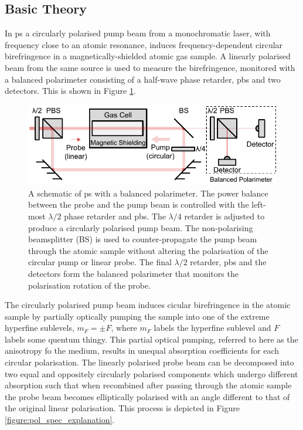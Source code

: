 \subsection{Basic Theory}

In \gls{ps} a circularly polarised pump beam from a monochromatic laser, with frequency close to an atomic resonance, induces frequency-dependent circular birefringence in a magnetically-shielded atomic gas sample.
A linearly polarised beam from the same source is used to measure the birefringence, monitored with a balanced polarimeter consisting of a half-wave phase retarder, \gls{pbs} and two detectors. This is shown in Figure \ref{figure:pol_spec_schematic}.

\begin{figure}
\centering
\includegraphics[width=\linewidth]{chapter1/Figs/PolSpecSchematic.pdf}
\caption{A schematic of \gls{ps} with a balanced polarimeter. The power balance between the probe and the pump beam is controlled with the left-most $\lambda/2$ phase retarder and \gls{pbs}. The $\lambda/4$ retarder is adjusted to produce a circularly polarised pump beam. The non-polarising beamsplitter (BS) is used to counter-propagate the pump beam through the atomic sample without altering the polarisation of the circular pump or linear probe. The final $\lambda/2$ retarder, \gls{pbs} and the detectors form the balanced polarimeter that monitors the polarisation rotation of the probe.}
\label{figure:pol_spec_schematic}
\end{figure}

The circularly polarised pump beam induces cicular birefringence in the atomic sample by partially optically pumping the sample into one of the extreme hyperfine sublevels, $m_F=\pm F$, where $m_F$ labels the hyperfine sublevel and $F$ labels {\color{red}some quentum thingy.}
This partial optical pumping, referred to here as the anisotropy fo the medium, results in unequal absorption coefficients for each circular polarisation.
The linearly polarised probe beam can be decomposed into two equal and oppositely circularly polarised components which undergo different absorption such that when recombined after passing through the atomic sample the probe beam becomes elliptically polarised with an angle different to that of the original linear polarisation.
This process is depicted in Figure \ref{figure:pol_spec_explanation}.

